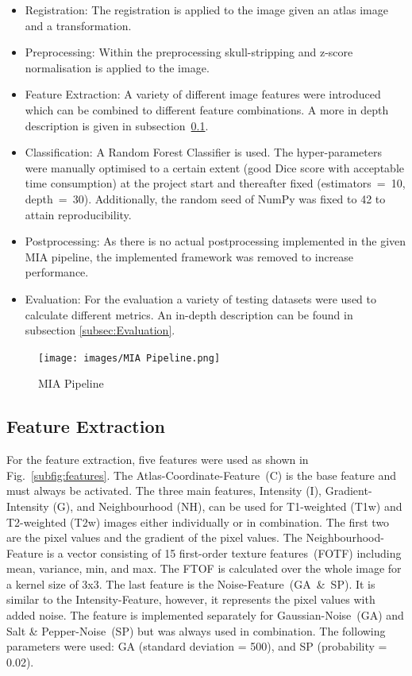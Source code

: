 \documentclass[conference]{IEEEtran}
\begin{document}
\begin{itemize}
    \item Registration: The registration is applied to the image given an atlas image and a transformation.
    \item Preprocessing: Within the preprocessing skull-stripping and z-score normalisation is applied to the image.
    \item Feature Extraction: A variety of different image features were introduced which can be combined to different feature combinations. A more in depth description is given in subsection~\ref{subsec:Feature Extraction}.
    \item Classification: A Random Forest Classifier is used. The hyper-parameters were manually optimised to a certain extent (good Dice score with acceptable time consumption) at the project start and thereafter fixed (estimators~=~10, depth~=~30). Additionally, the random seed of NumPy was fixed to 42 to attain reproducibility.
    \item Postprocessing: As there is no actual postprocessing implemented in the given MIA pipeline, the implemented framework was removed to increase performance.
    \item Evaluation: For the evaluation a variety of testing datasets were used to calculate different metrics. An in-depth description can be found in subsection \ref{subsec:Evaluation}.
\end{itemize}

\begin{figure}[h!]
  \centering
  \texttt{[image: images/MIA Pipeline.png]}
  \caption{MIA Pipeline}
  \label{fig:MIA pipeline}
\end{figure}

\subsection{Feature Extraction} \label{subsec:Feature Extraction}
For the feature extraction, five features were used as shown in Fig.~\ref{subfig:features}. The Atlas-Coordinate-Feature~(C) is the base feature and must always be activated. The three main features, Intensity (I), Gradient-Intensity (G), and Neighbourhood (NH), can be used for T1-weighted (T1w) and T2-weighted (T2w) images either individually or in combination. The first two are the pixel values and the gradient of the pixel values. The Neighbourhood-Feature is a vector consisting of 15 first-order texture features~(FOTF) including mean, variance, min, and max. The FTOF is calculated over the whole image for a kernel size of 3x3. The last feature is the Noise-Feature~(GA~\&~SP). It is similar to the Intensity-Feature, however, it represents the pixel values with added noise. The feature is implemented separately for Gaussian-Noise~(GA) and Salt \& Pepper-Noise~(SP) but was always used in combination. The following parameters were used: GA (standard deviation = 500), and SP (probability = 0.02).
\end{document}
